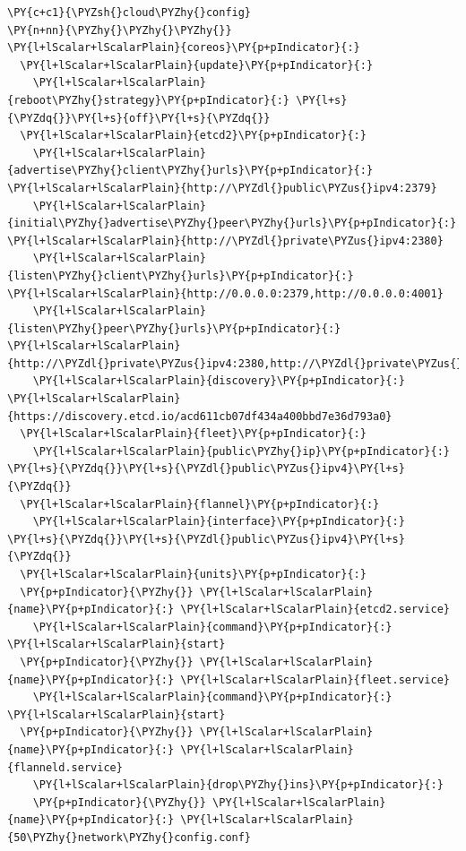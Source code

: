 \begin{codelisting}
\label{code:cloud-config1}
\begin{Verbatim}[fontsize=\relsize{-2.5},fontseries=b,commandchars=\\\{\}]
\PY{c+c1}{\PYZsh{}cloud\PYZhy{}config}
\PY{n+nn}{\PYZhy{}\PYZhy{}\PYZhy{}}
\PY{l+lScalar+lScalarPlain}{coreos}\PY{p+pIndicator}{:}
  \PY{l+lScalar+lScalarPlain}{update}\PY{p+pIndicator}{:}
    \PY{l+lScalar+lScalarPlain}{reboot\PYZhy{}strategy}\PY{p+pIndicator}{:} \PY{l+s}{\PYZdq{}}\PY{l+s}{off}\PY{l+s}{\PYZdq{}}
  \PY{l+lScalar+lScalarPlain}{etcd2}\PY{p+pIndicator}{:}
    \PY{l+lScalar+lScalarPlain}{advertise\PYZhy{}client\PYZhy{}urls}\PY{p+pIndicator}{:} \PY{l+lScalar+lScalarPlain}{http://\PYZdl{}public\PYZus{}ipv4:2379}
    \PY{l+lScalar+lScalarPlain}{initial\PYZhy{}advertise\PYZhy{}peer\PYZhy{}urls}\PY{p+pIndicator}{:} \PY{l+lScalar+lScalarPlain}{http://\PYZdl{}private\PYZus{}ipv4:2380}
    \PY{l+lScalar+lScalarPlain}{listen\PYZhy{}client\PYZhy{}urls}\PY{p+pIndicator}{:} \PY{l+lScalar+lScalarPlain}{http://0.0.0.0:2379,http://0.0.0.0:4001}
    \PY{l+lScalar+lScalarPlain}{listen\PYZhy{}peer\PYZhy{}urls}\PY{p+pIndicator}{:} \PY{l+lScalar+lScalarPlain}{http://\PYZdl{}private\PYZus{}ipv4:2380,http://\PYZdl{}private\PYZus{}ipv4:7001}
    \PY{l+lScalar+lScalarPlain}{discovery}\PY{p+pIndicator}{:} \PY{l+lScalar+lScalarPlain}{https://discovery.etcd.io/acd611cb07df434a400bbd7e36d793a0}
  \PY{l+lScalar+lScalarPlain}{fleet}\PY{p+pIndicator}{:}
    \PY{l+lScalar+lScalarPlain}{public\PYZhy{}ip}\PY{p+pIndicator}{:} \PY{l+s}{\PYZdq{}}\PY{l+s}{\PYZdl{}public\PYZus{}ipv4}\PY{l+s}{\PYZdq{}}
  \PY{l+lScalar+lScalarPlain}{flannel}\PY{p+pIndicator}{:}
    \PY{l+lScalar+lScalarPlain}{interface}\PY{p+pIndicator}{:} \PY{l+s}{\PYZdq{}}\PY{l+s}{\PYZdl{}public\PYZus{}ipv4}\PY{l+s}{\PYZdq{}}
  \PY{l+lScalar+lScalarPlain}{units}\PY{p+pIndicator}{:}
  \PY{p+pIndicator}{\PYZhy{}} \PY{l+lScalar+lScalarPlain}{name}\PY{p+pIndicator}{:} \PY{l+lScalar+lScalarPlain}{etcd2.service}
    \PY{l+lScalar+lScalarPlain}{command}\PY{p+pIndicator}{:} \PY{l+lScalar+lScalarPlain}{start}
  \PY{p+pIndicator}{\PYZhy{}} \PY{l+lScalar+lScalarPlain}{name}\PY{p+pIndicator}{:} \PY{l+lScalar+lScalarPlain}{fleet.service}
    \PY{l+lScalar+lScalarPlain}{command}\PY{p+pIndicator}{:} \PY{l+lScalar+lScalarPlain}{start}
  \PY{p+pIndicator}{\PYZhy{}} \PY{l+lScalar+lScalarPlain}{name}\PY{p+pIndicator}{:} \PY{l+lScalar+lScalarPlain}{flanneld.service}
    \PY{l+lScalar+lScalarPlain}{drop\PYZhy{}ins}\PY{p+pIndicator}{:}
    \PY{p+pIndicator}{\PYZhy{}} \PY{l+lScalar+lScalarPlain}{name}\PY{p+pIndicator}{:} \PY{l+lScalar+lScalarPlain}{50\PYZhy{}network\PYZhy{}config.conf}

\end{Verbatim}
\end{codelisting}
